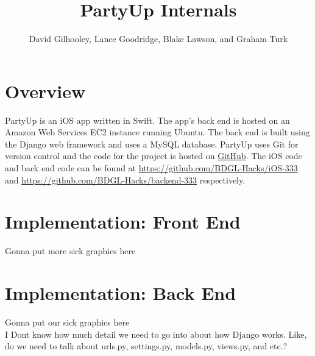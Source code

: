 \documentclass[12pt]{article}
\title{PartyUp Internals}
\author{David Gilhooley, Lance Goodridge, Blake Lawson, and Graham Turk}
\begin{document}
\pagestyle{plain}

\maketitle

\section{Overview}

PartyUp is an iOS app written in Swift.
The app's back end is hosted on an Amazon Web Services
EC2 instance running Ubuntu.
The back end is built using the Django web framework and uses
a MySQL database.
PartyUp uses Git for version control and the code for the project is 
hosted on \href{https://github.com/}{GitHub}.
The iOS code and back end code can be found at 
\url{https://github.com/BDGL-Hacks/iOS-333} and
\url{https://github.com/BDGL-Hacks/backend-333} respectively.


\section{Implementation: Front End}

Gonna put more sick graphics here

\section{Implementation: Back End}

Gonna put our sick graphics here \\
I Dont know how much detail we need to go into about how
Django works. Like, do we need to talk about urls.py, settings.py,
models.py, views.py, and etc.?
\end{document}
